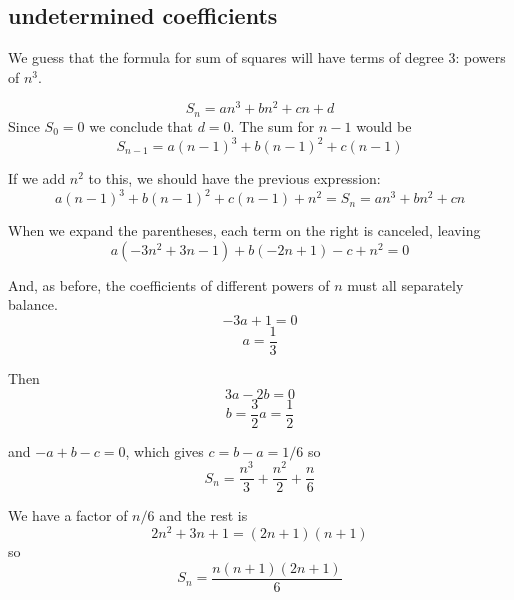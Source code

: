 \documentclass[11pt, oneside]{article}
\begin{document}
\subsection*{undetermined coefficients}

We guess that the formula for sum of squares will have terms of degree 3:  powers of $n^3$.

\[ S_{n} = an^3 + bn^2 + cn + d \]
Since $S_0 = 0$ we conclude that $d = 0$.  The sum for $n-1$ would be
\[ S_{n-1} = a(n-1)^3 + b(n-1)^2 + c(n-1)  \]

If we add $n^2$ to this, we should have the previous expression:
\[ a(n-1)^3 + b(n-1)^2 + c(n-1) + n^2 = S_n =  an^3 + bn^2 + cn  \]

When we expand the parentheses, each term on the right is canceled, leaving 
\[ a(-3n^2 + 3n - 1) + b(- 2n + 1) - c + n^2 =  0  \]

And, as before, the coefficients of different powers of $n$ must all separately balance.
\[ -3a + 1 = 0 \]
\[ a = \frac{1}{3} \]

Then
\[ 3a - 2b = 0 \]
\[ b = \frac{3}{2} a = \frac{1}{2} \]

and $-a + b - c = 0$, which gives $c = b - a = 1/6$ so
\[ S_n = \frac{n^3}{3} + \frac{n^2}{2} + \frac{n}{6} \]

We have a factor of $n/6$ and the rest is
\[ 2n^2 + 3n + 1 = (2n + 1)(n + 1) \]
so
\[ S_n = \frac{n(n+1)(2n+1)}{6} \]
\end{document}
